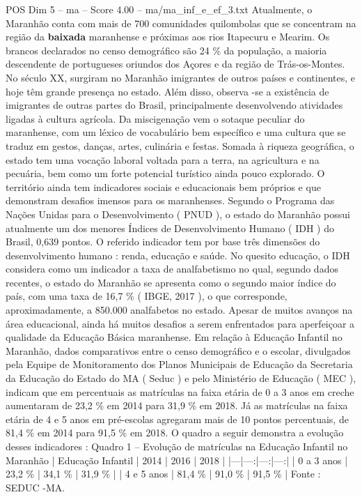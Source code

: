 \begin{textsample}{POS Dim 5 – ma – Score 4.00 – ma/ma\_inf\_e\_ef\_3.txt}
Atualmente, o Maranhão conta com mais de 700 comunidades quilombolas que se concentram na região da \textbf{baixada} maranhense e próximas aos rios Itapecuru e Mearim.
Os brancos declarados no censo demográfico são 24 \% da população, a maioria descendente de portugueses oriundos dos Açores e da região de Trás-os-Montes.
No século XX, surgiram no Maranhão imigrantes de outros países e continentes, e hoje têm grande presença no estado.
Além disso, observa -se a existência de imigrantes de outras partes do Brasil, principalmente desenvolvendo atividades ligadas à cultura agrícola.
Da miscigenação vem o sotaque peculiar do maranhense, com um léxico de vocabulário bem específico e uma cultura que se traduz em gestos, danças, artes, culinária e festas.
Somada à riqueza geográfica, o estado tem uma vocação laboral voltada para a terra, na agricultura e na pecuária, bem como um forte potencial turístico ainda pouco explorado.
O território ainda tem indicadores sociais e educacionais bem próprios e que demonstram desafios imensos para os maranhenses.
Segundo o Programa das Nações Unidas para o Desenvolvimento ( PNUD ), o estado do Maranhão possui atualmente um dos menores Índices de Desenvolvimento Humano ( IDH ) do Brasil, 0,639 pontos.
O referido indicador tem por base três dimensões do desenvolvimento humano : renda, educação e saúde.
No quesito educação, o IDH considera como um indicador a taxa de analfabetismo no qual, segundo dados recentes, o estado do Maranhão se apresenta como o segundo maior índice do país, com uma taxa de 16,7 \% ( IBGE, 2017 ), o que corresponde, aproximadamente, a 850.000 analfabetos no estado.
Apesar de muitos avanços na área educacional, ainda há muitos desafios a serem enfrentados para aperfeiçoar a qualidade da Educação Básica maranhense.
Em relação à Educação Infantil no Maranhão, dados comparativos entre o censo demográfico e o escolar, divulgados pela Equipe de Monitoramento dos Planos Municipais de Educação da Secretaria da Educação do Estado do MA ( Seduc ) e pelo Ministério de Educação ( MEC ), indicam que em percentuais as matrículas na faixa etária de 0 a 3 anos em creche aumentaram de 23,2 \% em 2014 para 31,9 \% em 2018.
Já as matrículas na faixa etária de 4 e 5 anos em pré-escolas agregaram mais de 10 pontos percentuais, de 81,4 \% em 2014 para 91,5 \% em 2018.
O quadro a seguir demonstra a evolução desses indicadores : Quadro 1 – Evolução de matrículas na Educação Infantil no Maranhão | Educação Infantil | 2014 | 2016 | 2018 | |---|---:|---:|---:| | 0 a 3 anos | 23,2 \% | 34,1 \% | 31,9 \% | | 4 e 5 anos | 81,4 \% | 91,0 \% | 91,5 \% | Fonte : SEDUC -MA.

\end{textsample}
